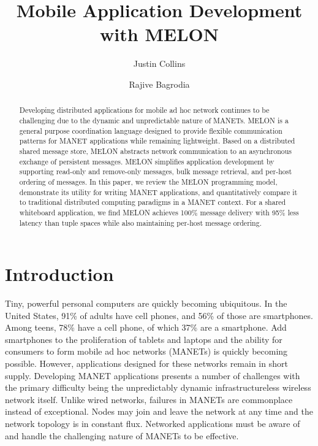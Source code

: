 \documentclass{llncs}
\begin{document}
%
\title{Mobile Application Development with MELON}
%
\author{Justin Collins \and Rajive Bagrodia}
%
%

\maketitle

\begin{abstract}
Developing distributed applications for mobile ad hoc network continues to be challenging due to the dynamic and unpredictable nature of MANETs. MELON is a general purpose coordination language designed to provide flexible communication patterns for MANET applications while remaining lightweight. Based on a distributed shared message store, MELON abstracts network communication to an asynchronous exchange of persistent messages. MELON simplifies application development by supporting read-only and remove-only messages, bulk message retrieval, and per-host ordering of messages. In this paper, we review the MELON programming model, demonstrate its utility for writing MANET applications, and quantitatively compare it to traditional distributed computing paradigms in a MANET context. For a shared whiteboard application, we find MELON achieves 100\% message delivery with 95\% less latency than tuple spaces while also maintaining per-host message ordering.
\end{abstract}

\section{Introduction}

Tiny, powerful personal computers are quickly becoming ubiquitous. In the United States, 91\% of adults have cell phones, and 56\% of those are smartphones\cite{cellphones}. Among teens, 78\% have a cell phone, of which 37\% are a smartphone\cite{teenphones}. Add smartphones to the proliferation of tablets and laptops and the ability for consumers to form mobile ad hoc networks (MANETs) is quickly becoming possible. However, applications designed for these networks remain in short supply. Developing MANET applications presents a number of challenges with the primary difficulty being the unpredictably dynamic infrastructureless wireless network itself. Unlike wired networks, failures in MANETs are commonplace instead of exceptional. Nodes may join and leave the network at any time and the network topology is in constant flux. Networked applications must be aware of and handle the challenging nature of MANETs to be effective.
\end{document}
